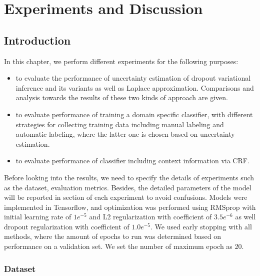 
\chapter{Experiments and Discussion}

\section{Introduction}
In this chapter, we perform different experiments for the following purposes:
\begin{itemize}
	\item to evaluate the performance of uncertainty estimation of dropout variational inference and its variants as well as Laplace approximation. Comparisons and analysis towards the results of these two kinds of approach are given.
	
	\item to evaluate performance of training a domain specific classifier, with different strategies for collecting training data including manual labeling and automatic labeling, where the latter one is chosen based on uncertainty estimation.
	
	\item to evaluate performance of classifier including context information via CRF.
\end{itemize}

Before looking into the results, we need to specify the details of experiments such as the dataset, evaluation metrics. Besides, the detailed parameters of the model will be reported in section of each experiment to avoid confusions. Models were implemented in Tensorflow\cite{abadi2016tensorflow}, and optimization was performed using RMSprop with initial learning rate of $1e^{-5}$ and L2 regularization with coefficient of $3.5e^{-6}$ as well dropout regularization with coefficient of $1.0e^{-5}$. We used early stopping with all methods, where the amount of epochs to run was determined based on performance on a validation set. We set the number of maximum epoch as 20.

\newpage
\subsection{Dataset}
